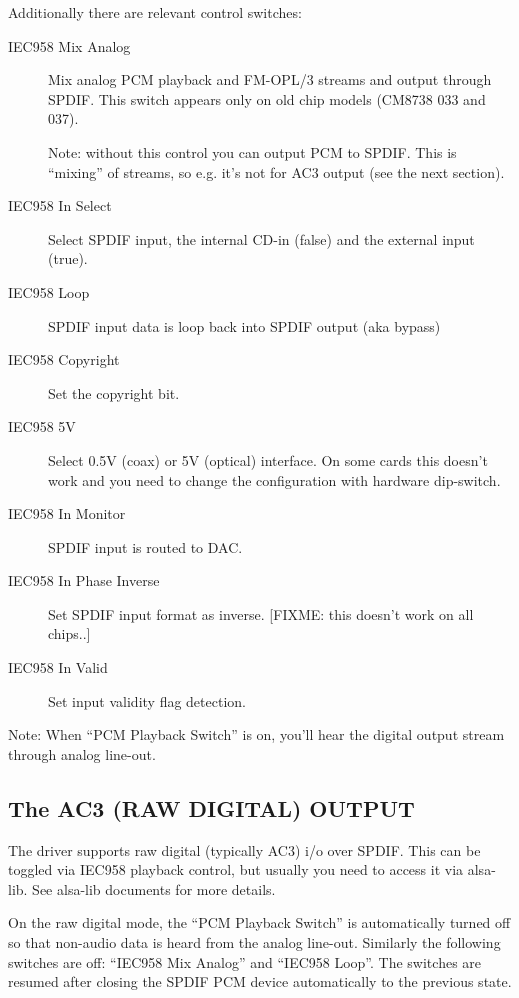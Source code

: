 \documentclass[a4paper,8pt,english]{sphinxmanual}
\begin{document}
Additionally there are relevant control switches:
\begin{description}
\item[{IEC958 Mix Analog}] \leavevmode
Mix analog PCM playback and FM-OPL/3 streams and
output through SPDIF.  This switch appears only on old chip
models (CM8738 033 and 037).

Note: without this control you can output PCM to SPDIF.
This is ``mixing'' of streams, so e.g. it's not for AC3 output
(see the next section).

\item[{IEC958 In Select}] \leavevmode
Select SPDIF input, the internal CD-in (false)
and the external input (true).

\item[{IEC958 Loop}] \leavevmode
SPDIF input data is loop back into SPDIF
output (aka bypass)

\item[{IEC958 Copyright}] \leavevmode
Set the copyright bit.

\item[{IEC958 5V}] \leavevmode
Select 0.5V (coax) or 5V (optical) interface.
On some cards this doesn't work and you need to change the
configuration with hardware dip-switch.

\item[{IEC958 In Monitor}] \leavevmode
SPDIF input is routed to DAC.

\item[{IEC958 In Phase Inverse}] \leavevmode
Set SPDIF input format as inverse.
{[}FIXME: this doesn't work on all chips..{]}

\item[{IEC958 In Valid}] \leavevmode
Set input validity flag detection.

\end{description}

Note: When ``PCM Playback Switch'' is on, you'll hear the digital output
stream through analog line-out.


\subsection{The AC3 (RAW DIGITAL) OUTPUT}
\label{sound/cards/cmipci:the-ac3-raw-digital-output}
The driver supports raw digital (typically AC3) i/o over SPDIF.  This
can be toggled via IEC958 playback control, but usually you need to
access it via alsa-lib.  See alsa-lib documents for more details.

On the raw digital mode, the ``PCM Playback Switch'' is automatically
turned off so that non-audio data is heard from the analog line-out.
Similarly the following switches are off: ``IEC958 Mix Analog'' and
``IEC958 Loop''.  The switches are resumed after closing the SPDIF PCM
device automatically to the previous state.
\end{document}
